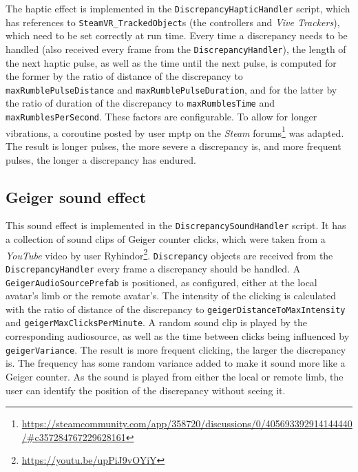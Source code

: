 \begin{sloppypar}
The haptic effect is implemented in the \texttt{DiscrepancyHapticHandler} script, which has references to \texttt{SteamVR\_TrackedObject}s (the controllers and \textit{Vive Trackers}), which need to be set correctly at run time.
\newline
Every time a discrepancy needs to be handled (also received every frame from the \texttt{DiscrepancyHandler}), the length of the next haptic pulse, as well as the time until the next pulse, is computed for the former by the ratio of distance of the discrepancy to \texttt{maxRumblePulseDistance} and \texttt{maxRumblePulseDuration}, and for the latter by the ratio of duration of the discrepancy to \texttt{maxRumblesTime} and \texttt{maxRumblesPerSecond}. These factors are configurable. To allow for longer vibrations, a coroutine posted by user mptp on the \textit{Steam} forums\footnote{\url{https://steamcommunity.com/app/358720/discussions/0/405693392914144440/\#c357284767229628161}} was adapted.
\newline
The result is longer pulses, the more severe a discrepancy is, and more frequent pulses, the longer a discrepancy has endured.
\end{sloppypar}


\subsection{Geiger sound effect}

This sound effect is implemented in the \texttt{DiscrepancySoundHandler} script. It has a collection of sound clips of Geiger counter clicks, which were taken from a \textit{YouTube} video by user Ryhindor\footnote{\url{https://youtu.be/upPiJ9vOYiY}}. \texttt{Discrepancy} objects are received from the \texttt{DiscrepancyHandler} every frame a discrepancy should be handled. 
\newline
A \texttt{GeigerAudioSourcePrefab} is positioned, as configured, either at the local avatar's limb or the remote avatar's. The intensity of the clicking is calculated with the ratio of distance of the discrepancy to \texttt{geigerDistanceToMaxIntensity} and \texttt{geigerMaxClicksPerMinute}. A random sound clip is played by the corresponding audiosource, as well as the time between clicks being influenced by \texttt{geigerVariance}. 
\newline
The result is more frequent clicking, the larger the discrepancy is. The frequency has some random variance added to make it sound more like a Geiger counter. As the sound is played from either the local or remote limb, the user can identify the position of the discrepancy without seeing it.


